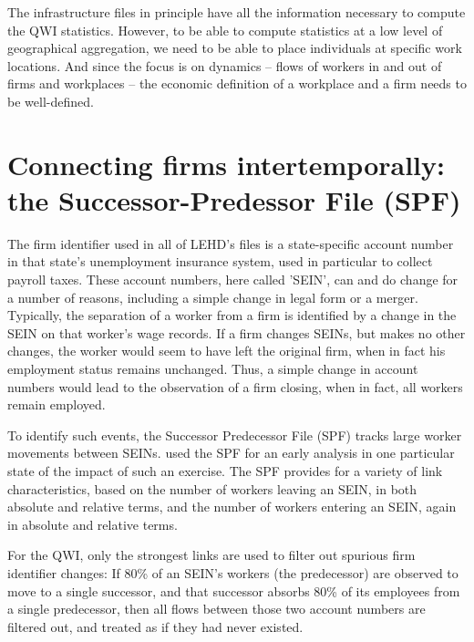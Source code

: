                       
%


The infrastructure files in principle have all the information necessary to
compute the QWI statistics. However, to be able to compute statistics at a
low level of geographical aggregation, we need to be able to place
individuals at specific work locations. And since the focus is on dynamics
-- flows of workers in and out of firms and workplaces -- the economic
definition of a workplace and a firm needs to be well-defined.


\section{Connecting firms intertemporally: the Successor-Predessor File
(SPF)}
\label{sec:spf}

The firm identifier used in all of LEHD's files is a state-specific
account number in that state's unemployment insurance system, used in
particular to collect payroll taxes. These account numbers, here called 'SEIN', can and do
change for a number of reasons, including a simple change in legal form or
a merger. Typically, the separation of a worker from a firm is
identified by a change in the SEIN  on that worker's wage
records. If a firm changes SEINs, but makes no other changes, the
worker would seem to have left the original firm, when in fact his
employment status remains unchanged. Thus, a simple change in account
numbers would lead to the observation of a firm closing, when in fact, all
workers remain employed.

To identify such events, the Successor Predecessor File (SPF) tracks large worker movements between SEINs.
\citet{tp-2003-09} used the SPF for an early analysis in one particular state of
the impact of such an exercise. The SPF provides for a variety of link
characteristics, based on the number of workers leaving an SEIN, in both
absolute and relative terms, and the number of workers entering an SEIN,
again in absolute and relative terms. 

For the QWI, only the strongest links are used to filter out spurious firm
identifier changes: If 80\% of an SEIN's workers (the predecessor) are
observed to move to a single successor, and that successor absorbs 80\% of
its employees from a single predecessor, then all flows between those two
account numbers are filtered out, and treated as if they had never existed.


